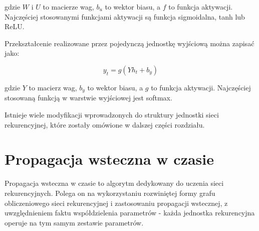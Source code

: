 \documentclass[oneside, mag]{mgr}
\begin{document}
gdzie $W$ i $U$ to macierze wag, $b_u$ to wektor biasu, a $f$ to funkcja aktywacji. Najczęściej stosowanymi funkcjami aktywacji są funkcja sigmoidalna, tanh lub ReLU.

Przekształcenie realizowane przez pojedynczą jednostkę wyjściową można zapisać jako:

\begin{equation}
	y_t = g(Y h_t + b_y)
\end{equation}

gdzie $Y$ to macierz wag, $b_y$ to wektor biasu, a $g$ to funkcja aktywacji. Najczęściej stosowaną funkcją w warstwie wyjściowej jest softmax.

Istnieje wiele modyfikacji wprowadzonych do struktury jednostki sieci rekurencyjnej, które zostały omówione w dalszej części rozdziału.

\section{Propagacja wsteczna w czasie}

Propagacja wsteczna w czasie to algorytm dedykowany do uczenia sieci rekurencyjnych. Polega on na wykorzystaniu rozwiniętej formy grafu obliczeniowego sieci rekurencyjnej i zastosowaniu propagacji wstecznej, z uwzględnieniem faktu współdzielenia parametrów - każda jednostka rekurencyjna operuje na tym samym zestawie parametrów.
\end{document}
